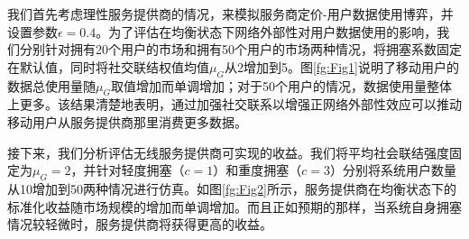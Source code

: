 我们首先考虑理性服务提供商的情况，来模拟服务商定价-用户数据使用博弈，并设置参数$\epsilon=0.4$。为了评估在均衡状态下网络外部性对用户数据使用的影响，我们分别针对拥有20个用户的市场和拥有50个用户的市场两种情况，将拥塞系数固定在默认值，同时将社交联结权值均值$\mu_{G}$从2增加到5。图\ref{fg:Fig1}说明了移动用户的数据总使用量随$\mu_{G}$取值增加而单调增加；对于50个用户的情况，数据使用量整体上更多。该结果清楚地表明，通过加强社交联系以增强正网络外部性效应可以推动移动用户从服务提供商那里消费更多数据。

接下来，我们分析评估无线服务提供商可实现的收益。我们将平均社会联结强度固定为$\mu_{G}=2$，并针对轻度拥塞（$c=1$）和重度拥塞（$c=3$）分别将系统用户数量从10增加到50两种情况进行仿真。如图\ref{fg:Fig2}所示，服务提供商在均衡状态下的标准化收益随市场规模的增加而单调增加。而且正如预期的那样，当系统自身拥塞情况较轻微时，服务提供商将获得更高的收益。

